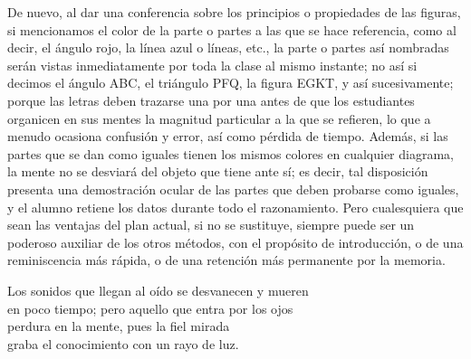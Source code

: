 \documentclass[booklanguage=english]{byrnebook}
\begin{document}
De nuevo, al dar una conferencia sobre los principios o propiedades de las figuras, si mencionamos el color de la parte o partes a las que se hace referencia, como al decir, el ángulo rojo, la línea azul o líneas, etc., la parte o partes así nombradas serán vistas inmediatamente por toda la clase al mismo instante; no así si decimos el ángulo ABC, el triángulo PFQ, la figura EGKT, y así sucesivamente; porque las letras deben trazarse una por una antes de que los estudiantes organicen en sus mentes la magnitud particular a la que se refieren, lo que a menudo ocasiona confusión y error, así como pérdida de tiempo. Además, si las partes que se dan como iguales tienen los mismos colores en cualquier diagrama, la mente no se desviará del objeto que tiene ante sí; es decir, tal disposición presenta una demostración ocular de las partes que deben probarse como iguales, y el alumno retiene los datos durante todo el razonamiento. Pero cualesquiera que sean las ventajas del plan actual, si no se sustituye, siempre puede ser un poderoso auxiliar de los otros métodos, con el propósito de introducción, o de una reminiscencia más rápida, o de una retención más permanente por la memoria.

\pagebreak


\baselineskip

\begin{center} %
Los sonidos que llegan al oído se desvanecen y mueren \\
en poco tiempo; pero aquello que entra por los ojos \\
perdura en la mente, pues la fiel mirada \\
graba el conocimiento con un rayo de luz. \\

\end{center}
\end{document}
